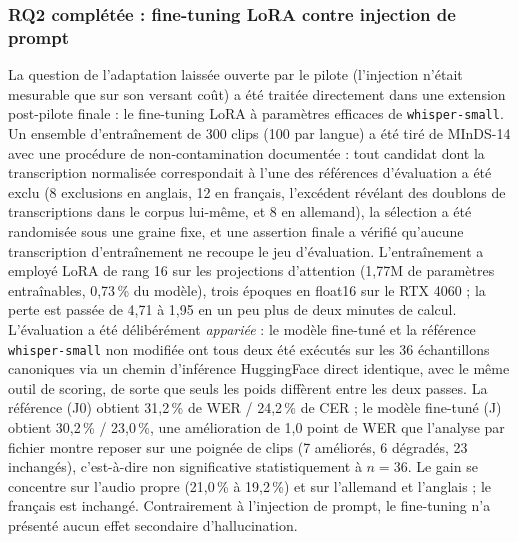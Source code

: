 \documentclass[12pt]{report}
\begin{document}
\subsubsection{RQ2 complétée : fine-tuning LoRA contre injection de prompt}
La question de l'adaptation laissée ouverte par le pilote (l'injection n'était mesurable que sur son versant coût) a été traitée directement dans une extension post-pilote finale : le fine-tuning LoRA à paramètres efficaces de \texttt{whisper-small}. Un ensemble d'entraînement de 300 clips (100 par langue) a été tiré de MInDS-14 avec une procédure de non-contamination documentée : tout candidat dont la transcription normalisée correspondait à l'une des références d'évaluation a été exclu (8 exclusions en anglais, 12 en français, l'excédent révélant des doublons de transcriptions dans le corpus lui-même, et 8 en allemand), la sélection a été randomisée sous une graine fixe, et une assertion finale a vérifié qu'aucune transcription d'entraînement ne recoupe le jeu d'évaluation. L'entraînement a employé LoRA de rang 16 sur les projections d'attention (1,77M de paramètres entraînables, 0,73\,\% du modèle), trois époques en float16 sur le RTX 4060 ; la perte est passée de 4,71 à 1,95 en un peu plus de deux minutes de calcul.
L'évaluation a été délibérément \emph{appariée} : le modèle fine-tuné et la référence \texttt{whisper-small} non modifiée ont tous deux été exécutés sur les 36 échantillons canoniques via un chemin d'inférence HuggingFace direct identique, avec le même outil de scoring, de sorte que seuls les poids diffèrent entre les deux passes. La référence (J0) obtient 31,2\,\% de WER / 24,2\,\% de CER ; le modèle fine-tuné (J) obtient 30,2\,\% / 23,0\,\%, une amélioration de 1,0 point de WER que l'analyse par fichier montre reposer sur une poignée de clips (7 améliorés, 6 dégradés, 23 inchangés), c'est-à-dire non significative statistiquement à $n=36$. Le gain se concentre sur l'audio propre (21,0\,\% à 19,2\,\%) et sur l'allemand et l'anglais ; le français est inchangé. Contrairement à l'injection de prompt, le fine-tuning n'a présenté aucun effet secondaire d'hallucination.
\end{document}

